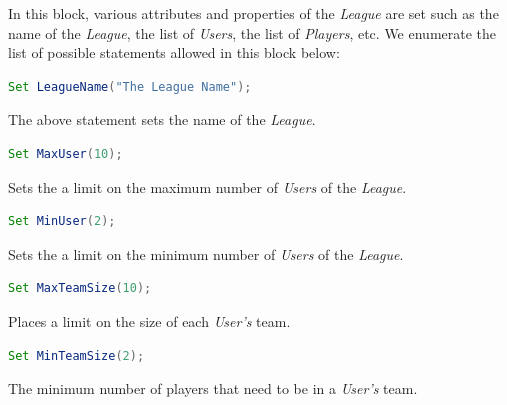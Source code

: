 \documentclass[12pt]{report}
\begin{document}
In this block, various attributes and properties of the \textit{League} are set such as the name of the \textit{League}, the list of \textit{Users}, the list of \textit{Players}, etc. We enumerate the list of possible statements allowed in this block below:

\begin{singlespace}
\begin{lstlisting}[language=Java,label=some-code,caption=Setting league name]
Set LeagueName("The League Name");
\end{lstlisting}
\end{singlespace}

The above statement sets the name of the \textit{League}.

\begin{singlespace}
\begin{lstlisting}[language=Java,label=some-code,caption=Setting maximun number of Users]
Set MaxUser(10);
\end{lstlisting}
\end{singlespace}

Sets the a limit on the maximum number of \textit{Users} of the \textit{League}.

\begin{singlespace}
\begin{lstlisting}[language=Java,label=some-code,caption=Setting minimum number of Users]
Set MinUser(2);
\end{lstlisting}
\end{singlespace}

Sets the a limit on the minimum number of \textit{Users} of the \textit{League}.

\begin{singlespace}
\begin{lstlisting}[language=Java,label=some-code,caption=Setting maximum size of each team]
Set MaxTeamSize(10);
\end{lstlisting}
\end{singlespace}

Places a limit on the size of each \textit{User's} team.

\begin{singlespace}
\begin{lstlisting}[language=Java,label=some-code,caption=Setting minimum size of each team]
Set MinTeamSize(2);
\end{lstlisting}
\end{singlespace}

The minimum number of players that need to be in a \textit{User's} team.
\end{document}
